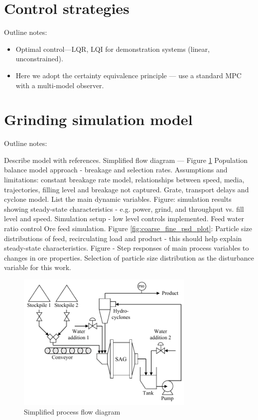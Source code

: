 
\section{Control strategies}

Outline notes:
\begin{itemize}
	\item Optimal control—LQR, LQI for demonstration systems (linear, unconstrained).
	\item Here we adopt the certainty equivalence principle — use a standard MPC with a multi-model observer.
\end{itemize}

\section{Grinding simulation model}

Outline notes:
\begin{outline}
	\1 Describe model with references.
	\1 Simplified flow diagram — Figure \ref{fig:sag-diag}
	\1 Population balance model approach - breakage and selection rates.
    \1 Assumptions and limitations: constant breakage rate model, relationships between speed, media, trajectories,  filling level and breakage not captured.
	\1 Grate, transport delays and cyclone model.
	\1 List the main dynamic variables.
	\1 Figure: simulation results showing steady-state characteristics - e.g. power, grind, and throughput vs. fill level and speed.
	\1 Simulation setup - low level controls implemented.
	\2 Feed water ratio control
	\2 Ore feed simulation.
	\1 Figure \ref{fig:coarse_fine_psd_plot}: Particle size distributions of feed, recirculating load and product - this should help explain steady-state characteristics.
	\1 Figure - Step responses of main process variables to changes in ore properties.
	\1 Selection of particle size distribution as the disturbance variable for this work.
\end{outline}

\begin{figure}[htp]
	\centering
	\includegraphics[width=8.5cm]{images/sag-circuit-diag.pdf}
	\caption{Simplified process flow diagram}
	\label{fig:sag-diag}
\end{figure}

